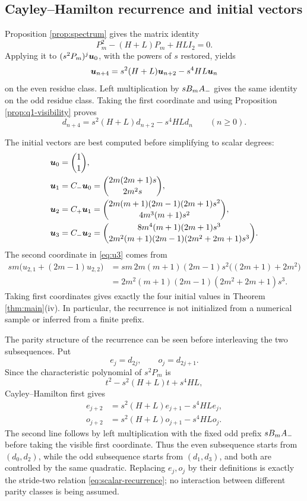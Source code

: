 \documentclass[11pt]{article}
\theoremstyle{definition}
\theoremstyle{remark}
\begin{document}
\subsection{Cayley--Hamilton recurrence and initial vectors}

Proposition \ref{prop:spectrum} gives the matrix identity
\begin{equation}
P_m^2-(H+L)P_m+HL I_2=0.
\label{eq:cayley-hamilton}
\end{equation}
Applying it to \((s^2P_m)^j\boldsymbol{u}_0\), with the powers of \(s\) restored,
yields
\begin{equation}
\boldsymbol{u}_{n+4}=s^2(H+L)\boldsymbol{u}_{n+2}-s^4HL\boldsymbol{u}_n
\label{eq:vector-recurrence}
\end{equation}
on the even residue class.  Left multiplication by \(sB_mA_{-}\) gives the
same identity on the odd residue class.  Taking the first coordinate and
using Proposition \ref{prop:q1-visibility} proves
\begin{equation}
d_{n+4}=s^2(H+L)d_{n+2}-s^4HLd_n
\qquad(n\geq0).
\label{eq:scalar-recurrence}
\end{equation}

The initial vectors are best computed before simplifying to scalar degrees:
\begin{align}
\boldsymbol{u}_0&=\binom11,
\label{eq:u0}\\
\boldsymbol{u}_1&=C_{-}\boldsymbol{u}_0
=\binom{2m(2m+1)s}{2m^2s},
\label{eq:u1}\\
\boldsymbol{u}_2&=C_{+}\boldsymbol{u}_1
=\binom{2m(m+1)(2m-1)(2m+1)s^2}
{4m^3(m+1)s^2},
\label{eq:u2}\\
\boldsymbol{u}_3&=C_{-}\boldsymbol{u}_2
=\binom{8m^4(m+1)(2m+1)s^3}
{2m^2(m+1)(2m-1)(2m^2+2m+1)s^3}.
\label{eq:u3}
\end{align}
The second coordinate in \eqref{eq:u3} comes from
\begin{align*}
sm\bigl(u_{2,1}+(2m-1)u_{2,2}\bigr)
&=sm\,2m(m+1)(2m-1)s^2
   \bigl((2m+1)+2m^2\bigr)\\
&=2m^2(m+1)(2m-1)(2m^2+2m+1)s^3.
\end{align*}
Taking first coordinates gives exactly the four initial values in Theorem
\ref{thm:main}(iv).  In particular, the recurrence is not initialized from a
numerical sample or inferred from a finite prefix.

The parity structure of the recurrence can be seen before interleaving the
two subsequences.  Put
\[
e_j=d_{2j},\qquad o_j=d_{2j+1}.
\]
Since the characteristic polynomial of \(s^2P_m\) is
\[
t^2-s^2(H+L)t+s^4HL,
\]
Cayley--Hamilton first gives
\begin{align*}
e_{j+2}&=s^2(H+L)e_{j+1}-s^4HL e_j,\\
o_{j+2}&=s^2(H+L)o_{j+1}-s^4HL o_j.
\end{align*}
The second line follows by left multiplication with the fixed odd prefix
\(sB_mA_{-}\) before taking the visible first coordinate.  Thus the even
subsequence starts from \((d_0,d_2)\), while the odd subsequence starts from
\((d_1,d_3)\), and both are controlled by the same quadratic.  Replacing
\(e_j,o_j\) by their definitions is exactly the stride-two relation
\eqref{eq:scalar-recurrence}; no interaction between different parity
classes is being assumed.
\end{document}
